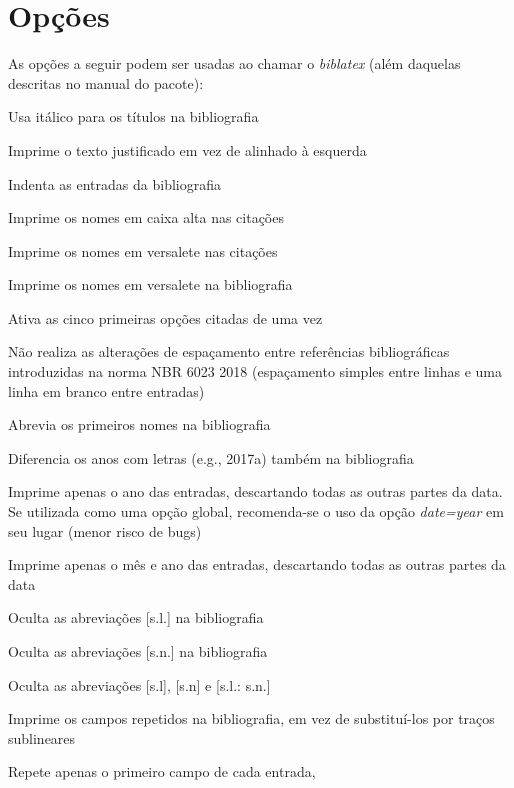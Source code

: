 \documentclass[a4paper]{article}
\begin{document}
\clearpage
\section{Opções}%
\label{sec:opções}

As opções a seguir podem ser usadas ao chamar o \textit{biblatex} (além
daquelas descritas no manual do pacote):

\begin{description}[itemindent=-1em,leftmargin=3em]%
  \item [ittitles] Usa itálico para os títulos na bibliografia
  \item [justify] Imprime o texto justificado em vez de alinhado à esquerda
  \item [indent] Indenta as entradas da bibliografia
  \item [accite] Imprime os nomes em caixa alta nas citações
  \item [sccite] Imprime os nomes em versalete nas citações
  \item [scbib] Imprime os nomes em versalete na bibliografia
  \item [pretty] Ativa as cinco primeiras opções citadas de uma vez
  \item [oldspacing] Não realiza as alterações de espaçamento entre
    referências bibliográficas introduzidas na norma NBR 6023 2018
    (espaçamento simples entre linhas e uma linha em branco entre
    entradas)
  \item [giveninits] Abrevia os primeiros nomes na bibliografia
  \item [extrayear] Diferencia os anos com letras (e.g., 2017a)
    também na bibliografia
  \item [dateyear] Imprime apenas o ano das entradas, descartando todas as outras partes da data. Se utilizada como uma opção global, recomenda-se o uso da opção \textit{date=year} em seu lugar (menor risco de bugs)
  \item [datemonth] Imprime apenas o mês e ano das entradas, descartando todas as outras partes da data
  \item [nosl] Oculta as abreviações [s.l.] na bibliografia
  \item [nosn] Oculta as abreviações [s.n.] na bibliografia
  \item [noslsn] Oculta as abreviações [s.l], [s.n] e [s.l.: s.n.]
  \item [repeatfields] Imprime os campos repetidos na bibliografia, em vez de
    subs\-ti\-tu\-í-los por traços sublineares
  \item [repeatfirstfields] Repete apenas o primeiro campo de cada entrada,

\end{description}
\end{document}
